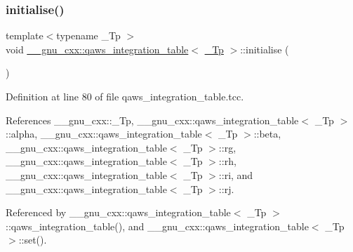 \subsubsection{\texorpdfstring{initialise()}{initialise()}}
{\footnotesize\ttfamily template$<$typename \+\_\+\+Tp $>$ \\
void \hyperlink{struct____gnu__cxx_1_1qaws__integration__table}{\+\_\+\+\_\+gnu\+\_\+cxx\+::qaws\+\_\+integration\+\_\+table}$<$ \hyperlink{namespace____gnu__cxx_a3b19a9c800ca194374ef9172290f7d79}{\+\_\+\+Tp} $>$\+::initialise (\begin{DoxyParamCaption}{ }\end{DoxyParamCaption})}



Definition at line 80 of file qaws\+\_\+integration\+\_\+table.\+tcc.



References \+\_\+\+\_\+gnu\+\_\+cxx\+::\+\_\+\+Tp, \+\_\+\+\_\+gnu\+\_\+cxx\+::qaws\+\_\+integration\+\_\+table$<$ \+\_\+\+Tp $>$\+::alpha, \+\_\+\+\_\+gnu\+\_\+cxx\+::qaws\+\_\+integration\+\_\+table$<$ \+\_\+\+Tp $>$\+::beta, \+\_\+\+\_\+gnu\+\_\+cxx\+::qaws\+\_\+integration\+\_\+table$<$ \+\_\+\+Tp $>$\+::rg, \+\_\+\+\_\+gnu\+\_\+cxx\+::qaws\+\_\+integration\+\_\+table$<$ \+\_\+\+Tp $>$\+::rh, \+\_\+\+\_\+gnu\+\_\+cxx\+::qaws\+\_\+integration\+\_\+table$<$ \+\_\+\+Tp $>$\+::ri, and \+\_\+\+\_\+gnu\+\_\+cxx\+::qaws\+\_\+integration\+\_\+table$<$ \+\_\+\+Tp $>$\+::rj.



Referenced by \+\_\+\+\_\+gnu\+\_\+cxx\+::qaws\+\_\+integration\+\_\+table$<$ \+\_\+\+Tp $>$\+::qaws\+\_\+integration\+\_\+table(), and \+\_\+\+\_\+gnu\+\_\+cxx\+::qaws\+\_\+integration\+\_\+table$<$ \+\_\+\+Tp $>$\+::set().


